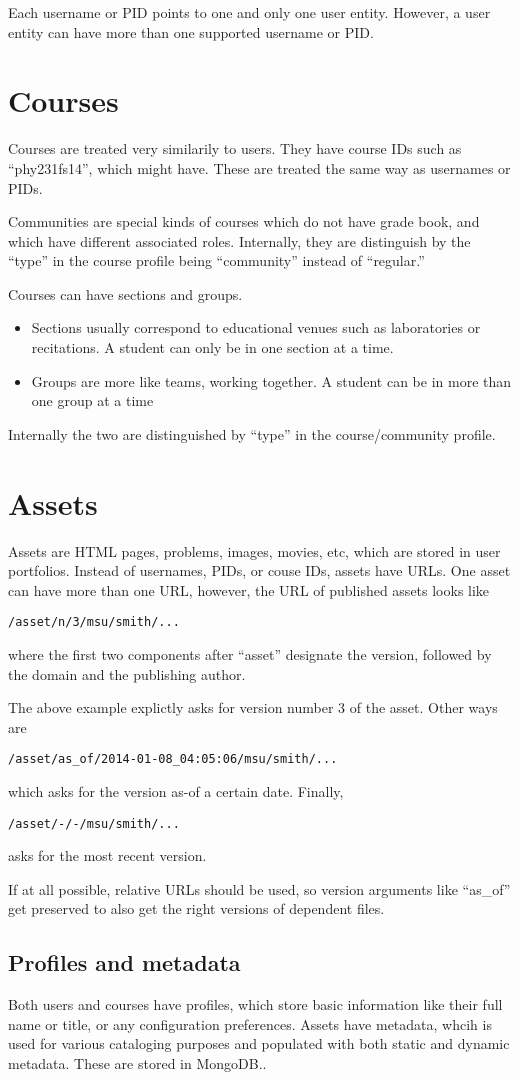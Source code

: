 Each username or PID points to one and only one user entity. However, a user entity can have more than one supported username or PID.
\section{Courses}
Courses are treated very similarily to users. They have course IDs such as ``phy231fs14'', which might have. These are treated the same way as usernames or PIDs.

Communities are special kinds of courses which do not have grade book, and which have different associated roles. Internally, they are distinguish by the ``type'' in the course profile being ``community'' instead of ``regular.''

Courses can have sections and groups.
\begin{itemize}
\item Sections usually correspond to educational venues such as laboratories or recitations. A student can only be in one section at a time.
\item Groups are more like teams, working together. A student can be in more than one group at a time
\end{itemize}
Internally the two are distinguished by ``type'' in the course/community profile.
\section{Assets}\label{assets}
Assets are HTML pages, problems, images, movies, etc, which are stored in user portfolios.
Instead of usernames, PIDs, or couse IDs, assets have URLs. One asset can have more than one URL, however, the URL of published assets looks like
\begin{center}
{\tt /asset/n/3/msu/smith/...}
\end{center}
where the first two components after ``asset'' designate the version, followed by the domain and the publishing author.

The above example explictly asks for version number 3 of the asset. Other ways are
\begin{center}
{\tt /asset/as\_of/2014-01-08\_04:05:06/msu/smith/...}
\end{center}
which asks for the version as-of a certain date. Finally,
\begin{center}
{\tt /asset/-/-/msu/smith/...}
\end{center}
asks for the most recent version.

If at all possible, relative URLs should be used, so version arguments like ``as\_of'' get preserved to also get the right versions of dependent files.
\subsection{Profiles and metadata}
Both users and courses have profiles, which store basic information like their full name or title, or any configuration preferences. Assets have metadata, whcih is used for various cataloging purposes and populated with both static and dynamic metadata. These are stored in MongoDB..
